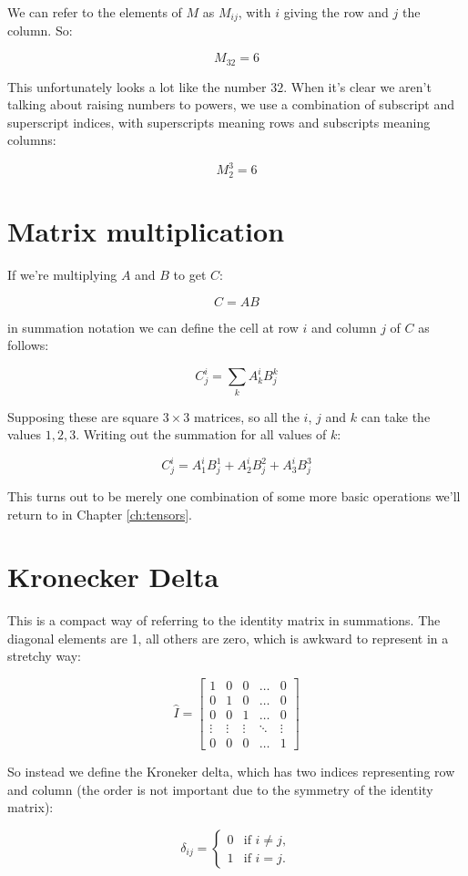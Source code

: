 We can refer to the elements of $M$ as $M_{ij}$, with $i$ giving the row and $j$ the column. So:

$$M_{32} = 6$$

This unfortunately looks a lot like the number $32$. When it's clear we aren't talking about raising numbers to powers, we use a combination of subscript and superscript indices, with superscripts meaning rows and subscripts meaning columns:

$$M^3_2 = 6$$

\section{Matrix multiplication}

If we're multiplying $A$ and $B$ to get $C$:

$$C = AB$$

in summation notation we can define the cell at row $i$ and column $j$ of $C$ as follows:

$$C^i_j = \sum_k{A^i_kB^k_j}$$

Supposing these are square $3 \times 3$ matrices, so all the $i$, $j$ and $k$ can take the values $1, 2, 3$. Writing out the summation for all values of $k$:

$$C^i_j = A^i_1B^1_j + A^i_2B^2_j + A^i_3B^3_j $$

This turns out to be merely one combination of some more basic operations we'll return to in Chapter \ref{ch:tensors}.

\section{Kronecker Delta} \label{def:kronecker}

This is a compact way of referring to the identity matrix in summations. The diagonal elements are 1, all others are zero, which is awkward to represent in a stretchy way:

$$
\hat{I} = \begin{bmatrix}
1 & 0 & 0 & \dots & 0 \\
0 & 1 & 0 & \dots & 0 \\
0 & 0 & 1 & \dots & 0 \\
\vdots & \vdots & \vdots & \ddots & \vdots\\
0 & 0 & 0 & \dots & 1
\end{bmatrix}
$$

So instead we define the Kroneker delta, which has two indices representing row and column (the order is not important due to the symmetry of the identity matrix):

$$
\delta_{ij} = \begin{cases}
0 &\text{if } i \neq j,   \\
1 &\text{if } i=j.   \end{cases}
$$

